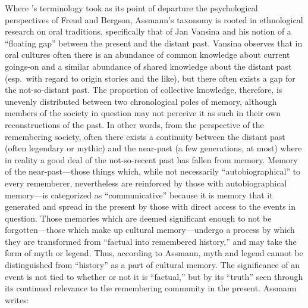 Where \halbwachs's terminology took as its point of
departure the psychological perspectives of
Freud\autocite{terdiman_radstone-schwarz2011} and
Bergson\autocite{ansellpearson_radstone-schwarz2011}, Assmann's taxonomy
is rooted in ethnological research on oral traditions, specifically that
of Jan Vansina and his notion of a ``floating gap'' between the present
and the distant past.\autocite{vansina1985} Vansina observes that in
oral cultures often there is an abundance of common knowledge about
current goings-on and a similar abundance of shared knowledge about the
distant past (esp.~with regard to origin stories and the like), but
there often exists a gap for the not-so-distant past. The proportion of
collective knowledge, therefore, is unevenly distributed between two
chronological poles of memory, although members of the society in
question may not perceive it as such in their own reconstructions of the
past.\autocites[23--24]{vansina1985}[As Assmann, observes, ``In the
cultural memory of a group, both levels of the past merge seamlessly
into one another.''][35]{assmann2011} In other words, from the
perspective of the remembering society, often there exists a continuity
between the distant past (often legendary or mythic) and the near-past
(a few generations, at most) where in reality a good deal of the
not-so-recent past has fallen from memory. Memory of the
near-past---those things which, while not necessarily
``autobiographical'' to every rememberer, nevertheless are reinforced by
those with autobiographical memory---is categorized as ``communicative''
because it is memory that it generated and spread in the present by
those with direct access to the events in question. Those memories which
are deemed significant enough to not be forgotten---those which make up
cultural memory---undergo a process by which they are transformed from
``factual into remembered history,'' and may take the form of myth or
legend.\autocite[37--38]{assmann2011} Thus, according to Assmann, myth
and legend cannot be distinguished from ``history'' as a part of
cultural memory. The significance of an event is not tied to whether or
not it is ``factual,'' but by its ``truth'' seen through its continued
relevance to the remembering community in the present.\autocite[Paul
Veyne offers a particularly stimulating discussion of the perception of
the past and its relationship to myth. He concludes his book with the
insightful quote, ``The theme of this book was very simple. Merely by
reading the title, anyone with the slightest historical background would
immediately have answered, `but of course they believed in their myths!'
We have simply wanted also to make clear that what is true of `them' is
also true of ourselves and to bring out the implications of this primary
truth.''][128--129]{veyne1988} Assmann writes:

